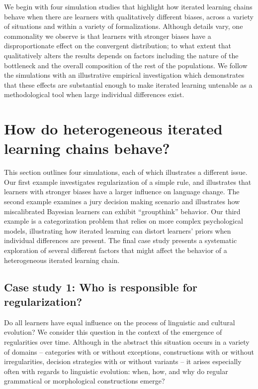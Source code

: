 \documentclass[doc]{apa6}
\begin{document}
We begin with four simulation studies that highlight how iterated learning chains behave when there are learners with qualitatively different biases, across a variety of situations and within a variety of formalizations. Although details vary, one commonality we observe is that learners with stronger biases have a disproportionate effect on the convergent distribution; to what extent that qualitatively alters the results depends on factors including the nature of the bottleneck and the overall composition of the rest of the populations. We follow the simulations with an illustrative empirical investigation which demonstrates that these effects are substantial enough to make iterated learning untenable as a methodological tool when large individual differences exist.


\section{How do heterogeneous iterated learning chains behave?}

This section outlines four simulations, each of which illustrates a different issue. Our first example investigates regularization of a simple rule, and  illustrates that learners with stronger biases have a larger influence on language change. The second example examines a jury decision making scenario and illustrates how miscalibrated Bayesian learners can exhibit ``groupthink'' behavior. Our third example is a categorization problem that relies on more complex psychological models, illustrating how iterated learning can distort learners' priors when individual differences are present. The final case study presents a systematic exploration of several different factors that might affect the behavior of a heterogeneous iterated learning chain.

\subsection{Case study 1: Who is responsible for regularization?}

Do all learners have equal influence on the process of linguistic and cultural evolution? We consider this question in the context of the emergence of regularities over time. Although in the abstract this situation occurs in a variety of domains -- categories with or without exceptions, constructions with or without irregularities, decision strategies with or without variants -- it arises especially often with regards to linguistic evolution: when, how, and why do regular grammatical or morphological constructions emerge?
\end{document}
